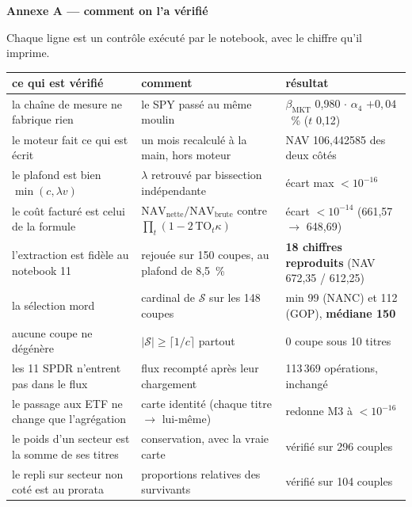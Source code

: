\documentclass[9pt,a4paper]{extarticle}
\begin{document}
\vspace{0.8mm}
{\color{bleu}\bfseries Annexe A --- comment on l'a vérifié}\par
\vspace{0.6mm}
{\footnotesize
Chaque ligne est un contrôle exécuté par le notebook, avec le chiffre qu'il imprime.\par}
\vspace{0.4mm}
{\centering\scriptsize
\begin{tabular}{@{}l l l@{}}
\toprule
\textbf{ce qui est vérifié} & \textbf{comment} & \textbf{résultat} \\
\midrule
la chaîne de mesure ne fabrique rien & le SPY passé au même moulin & $\beta_{\text{MKT}}$ 0,980 $\cdot$ $\alpha_4$ $+0{,}04$~\% ($t$ 0,12) \\
le moteur fait ce qui est écrit & un mois recalculé à la main, hors moteur & NAV 106,442585 des deux côtés \\
le plafond est bien $\min(c,\lambda v)$ & $\lambda$ retrouvé par bissection indépendante & écart max $<10^{-16}$ \\
le coût facturé est celui de la formule & $\mathrm{NAV}_{\text{nette}}/\mathrm{NAV}_{\text{brute}}$ contre $\prod_t(1-2\,\mathrm{TO}_t\kappa)$ & écart $<10^{-14}$ (661,57 $\to$ 648,69) \\
l'extraction est fidèle au notebook 11 & rejouée sur 150 coupes, au plafond de 8,5~\% & \textbf{18 chiffres reproduits} (NAV 672,35 / 612,25) \\
la sélection mord & cardinal de $\mathcal S$ sur les 148 coupes & min 99 (NANC) et 112 (GOP), \textbf{médiane 150} \\
aucune coupe ne dégénère & $\lvert\mathcal S\rvert \ge \lceil 1/c\rceil$ partout & 0 coupe sous 10 titres \\
les 11 SPDR n'entrent pas dans le flux & flux recompté après leur chargement & 113\,369 opérations, inchangé \\
le passage aux ETF ne change que l'agrégation & carte identité (chaque titre $\to$ lui-même) & redonne M3 à $<10^{-16}$ \\
le poids d'un secteur est la somme de ses titres & conservation, avec la vraie carte & vérifié sur 296 couples \\
le repli sur secteur non coté est au prorata & proportions relatives des survivants & vérifié sur 104 couples \\

\end{tabular}}
\end{document}
